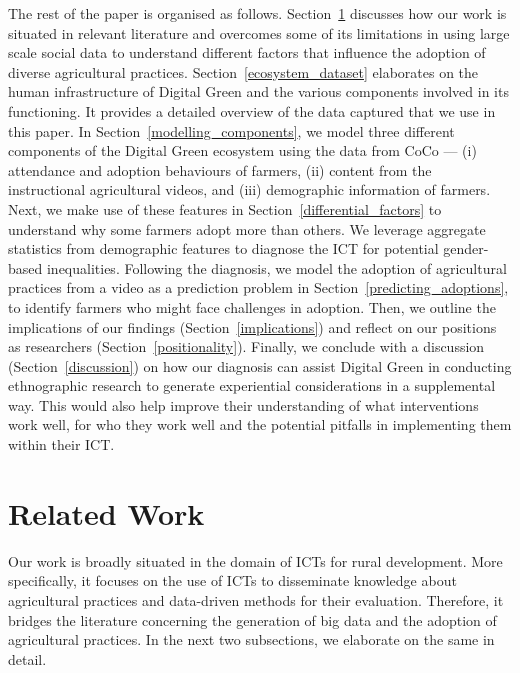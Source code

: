 \documentclass[manuscript,screen]{acmart}
\begin{document}
The rest of the paper is organised as follows. Section~\ref{related_work} discusses how our work is situated in relevant literature and overcomes some of its limitations in using large scale social data to understand different factors that influence the adoption of diverse agricultural practices. Section~\ref{ecosystem_dataset} elaborates on the human infrastructure of Digital Green and the various components involved in its functioning. It provides a detailed overview of the data captured that we use in this paper. In Section~\ref{modelling_components}, we model three different components of the Digital Green ecosystem using the data from CoCo --- (i) attendance and adoption behaviours of farmers, (ii) content from the instructional agricultural videos, and (iii) demographic information of farmers. Next, we make use  of these features in Section~\ref{differential_factors} to understand why some farmers adopt more than others. We leverage aggregate statistics from demographic features to diagnose the ICT for potential gender-based inequalities. Following the diagnosis, we model the adoption of agricultural practices from a video as a prediction problem in Section~\ref{predicting_adoptions}, to identify farmers who might face challenges in adoption.
Then, we outline the implications of our findings (Section~\ref{implications}) and reflect on our positions as researchers (Section~\ref{positionality}). Finally, we conclude with a discussion (Section~\ref{discussion}) on how our diagnosis can assist Digital Green in conducting ethnographic research to generate experiential considerations in a supplemental way. This would also help improve their understanding of what interventions work well, for who they work well and the potential pitfalls in implementing them within their ICT.

\section{Related Work} \label{related_work}

Our work is broadly situated in the domain of ICTs for rural development. More specifically, it focuses on the use of ICTs to disseminate knowledge about agricultural practices and data-driven methods for their evaluation. Therefore, it bridges the literature concerning the generation of big data and the adoption of agricultural practices. In the next two subsections, we elaborate on the same in detail.
\end{document}
